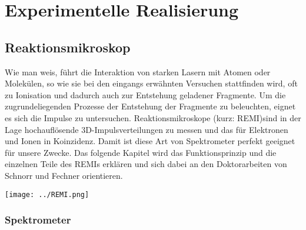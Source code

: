 \chapter{Experimentelle Realisierung} 

\section{Reaktionsmikroskop}

Wie man weis, führt die Interaktion von starken Lasern mit Atomen oder Molekülen, so wie sie bei den eingangs erwähnten Versuchen stattfinden wird, oft zu Ionisation und dadurch auch zur Entstehung geladener Fragmente. Um die zugrundeliegenden Prozesse der Entstehung der Fragmente zu beleuchten, eignet es sich die Impulse zu untersuchen. Reaktionsmikroskope (kurz: REMI)sind in der Lage hochauflösende 3D-Impulsverteilungen zu messen und das für Elektronen und Ionen in Koinzidenz. Damit ist diese Art von Spektrometer perfekt geeignet für unsere Zwecke. Das folgende Kapitel wird das Funktionsprinzip und die einzelnen Teile des REMIs erklären und sich dabei an den Doktorarbeiten von Schnorr \cite{Schn14} und Fechner \cite{Fech14} orientieren. %
\begin{center}
\begin{minipage}{\linewidth}
\centering
\texttt{[image: ../REMI.png]}%
 \label{fig:REMI}
\end{minipage} 
\end{center} 

\subsection{Spektrometer}

